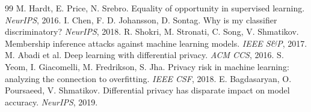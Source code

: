 \documentclass[10pt,a4paper]{article}
\begin{document}
\begin{thebibliography}{99}
 M. Hardt, E. Price, N. Srebro. Equality of opportunity in supervised learning. \emph{NeurIPS}, 2016.
 I. Chen, F. D. Johansson, D. Sontag. Why is my classifier discriminatory? \emph{NeurIPS}, 2018.
 R. Shokri, M. Stronati, C. Song, V. Shmatikov. Membership inference attacks against machine learning models. \emph{IEEE S\&P}, 2017.
 M. Abadi et al. Deep learning with differential privacy. \emph{ACM CCS}, 2016.
 S. Yeom, I. Giacomelli, M. Fredrikson, S. Jha. Privacy risk in machine learning: analyzing the connection to overfitting. \emph{IEEE CSF}, 2018.
 E. Bagdasaryan, O. Poursaeed, V. Shmatikov. Differential privacy has disparate impact on model accuracy. \emph{NeurIPS}, 2019.
\end{thebibliography}
\end{document}
